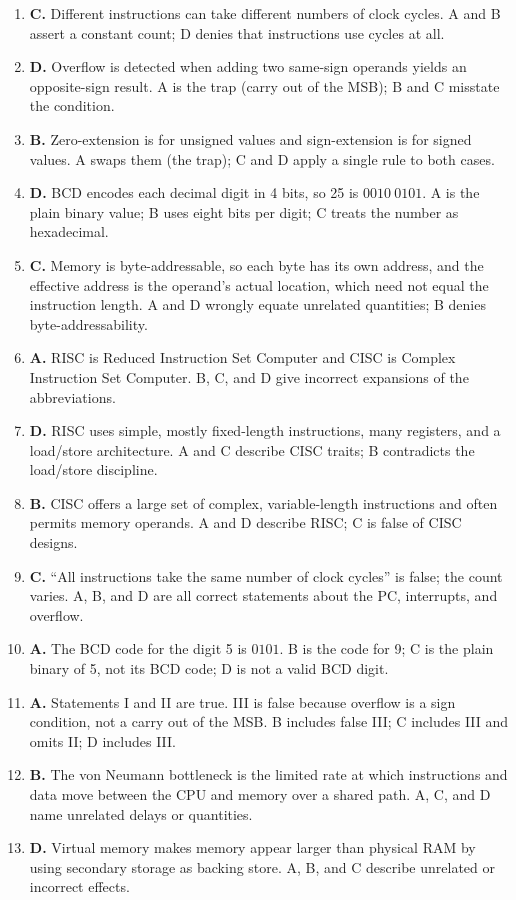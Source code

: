 \documentclass[11pt]{article}
\begin{document}
\begin{enumerate}[label=\textbf{Q\arabic*.}, leftmargin=*]
  execution. A is the trap (only after the whole program); B and C wrongly
  limit interrupts to boot or to hardware faults.
\item \textbf{C.} Different instructions can take different numbers of clock
  cycles. A and B assert a constant count; D denies that instructions use
  cycles at all.
\item \textbf{D.} Overflow is detected when adding two same-sign operands
  yields an opposite-sign result. A is the trap (carry out of the MSB); B and
  C misstate the condition.
\item \textbf{B.} Zero-extension is for unsigned values and sign-extension is
  for signed values. A swaps them (the trap); C and D apply a single rule to
  both cases.
\item \textbf{D.} BCD encodes each decimal digit in 4 bits, so 25 is
  $0010\ 0101$. A is the plain binary value; B uses eight bits per digit; C
  treats the number as hexadecimal.
\item \textbf{C.} Memory is byte-addressable, so each byte has its own
  address, and the effective address is the operand's actual location, which
  need not equal the instruction length. A and D wrongly equate unrelated
  quantities; B denies byte-addressability.
\item \textbf{A.} RISC is Reduced Instruction Set Computer and CISC is
  Complex Instruction Set Computer. B, C, and D give incorrect expansions of
  the abbreviations.
\item \textbf{D.} RISC uses simple, mostly fixed-length instructions, many
  registers, and a load/store architecture. A and C describe CISC traits; B
  contradicts the load/store discipline.
\item \textbf{B.} CISC offers a large set of complex, variable-length
  instructions and often permits memory operands. A and D describe RISC; C is
  false of CISC designs.
\item \textbf{C.} ``All instructions take the same number of clock cycles'' is
  false; the count varies. A, B, and D are all correct statements about the PC,
  interrupts, and overflow.
\item \textbf{A.} The BCD code for the digit 5 is $0101$. B is the code for 9;
  C is the plain binary of 5, not its BCD code; D is not a valid BCD digit.
\item \textbf{A.} Statements I and II are true. III is false because overflow
  is a sign condition, not a carry out of the MSB. B includes false III; C
  includes III and omits II; D includes III.
\item \textbf{B.} The von Neumann bottleneck is the limited rate at which
  instructions and data move between the CPU and memory over a shared path. A,
  C, and D name unrelated delays or quantities.
\item \textbf{D.} Virtual memory makes memory appear larger than physical RAM
  by using secondary storage as backing store. A, B, and C describe unrelated
  or incorrect effects.


\end{enumerate}
\end{document}
